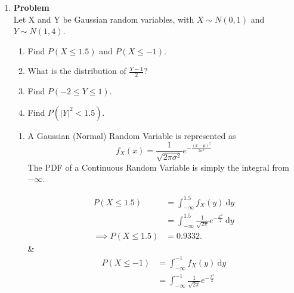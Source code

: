 \documentclass[12pt]{article}
\newenvironment{Ex}{\textbf{Problem}\vspace{.75em}\\}{}
\newcommand{\dd}[1]{\:\mathrm{d}{#1}}
\begin{document}
\begin{enumerate}
\begin{Ex}
\begin{solution}
\begin{enumerate}
\begin{equation}
\begin{aligned}
            &= \int_{-2}^{z} \left(\frac{2+2y}{3}\right) \dd{y} \\
          \end{aligned}
        \end{equation}
      \end{enumerate}
    \end{solution}
  \end{Ex}
\item
  \begin{Ex}
    Let X and Y be Gaussian random variables, with $X \sim N(0,1)$ and
    $Y \sim N(1,4)$.
    \begin{enumerate}
    \item Find $P(X \le 1.5)$ and $P(X \le -1)$.
    \item What is the distribution of $\frac{Y-1}{2}$?
    \item Find $P(-2 \le Y \le 1)$.
    \item Find $P(|Y|^2 < 1.5)$.
    \end{enumerate}
    \begin{solution} \hfill
      \begin{enumerate}
      \item A Gaussian (Normal) Random Variable is represented as
        \begin{equation}
          \label{eq:2-gaussian}
          f_X(x) = \frac{1}{\sqrt{2\pi\sigma^2}}e^{-\frac{(x-\mu)^2}{2\sigma^2}}
        \end{equation}
        The PDF of a Continuous Random Variable is simply the integral
        from $-\infty$.
        \begin{multicols}{2}
          \begin{equation}
            \label{eq:2ai-sol}
            \begin{aligned}
              P(X\le 1.5) &= \int_{-\infty}^{1.5} f_X(y) \dd{y} \\
              &= \int_{-\infty}^{1.5} \frac{1}{\sqrt{2\pi}}e^{-\frac{x^2}{2}}
              \dd{y} \\
              \implies P(X \le 1.5 )&= 0.9332.
            \end{aligned}
          \end{equation} &
          \begin{equation}
            \label{eq:2aii-sol}
            \begin{aligned}
              P(X\le -1) &= \int_{-\infty}^{-1} f_X(y) \dd{y} \\
              &= \int_{-\infty}^{-1} \frac{1}{\sqrt{2\pi}}e^{-\frac{x^2}{2}}

\end{aligned}
\end{equation}
\end{multicols}
\end{enumerate}
\end{solution}
\end{Ex}
\end{enumerate}
\end{document}
